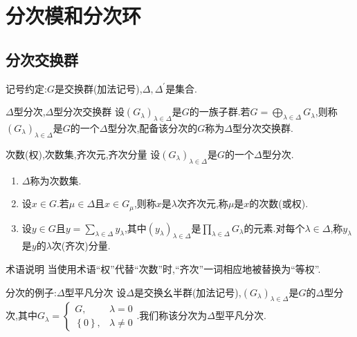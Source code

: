 \chapter{分次模和分次环}

\section{分次交换群}

记号约定:$G$是交换群(加法记号),$\Delta,\Delta^{\prime}$是集合.

\begin{definition}{$\Delta$型分次,$\Delta$型分次交换群}{}
	设$\left(G_{\lambda}\right)_{\lambda\in\Delta}$是$G$的一族子群.若$G=\bigoplus\limits_{\lambda\in\Delta}G_{\lambda}$,则称$\left(G_{\lambda}\right)_{\lambda\in\Delta}$是$G$的一个$\Delta$型分次,配备该分次的$G$称为$\Delta$型分次交换群.
\end{definition}

\begin{definition}{次数(权),次数集,齐次元,齐次分量}{}
	设$\left(G_{\lambda}\right)_{\lambda\in\Delta}$是$G$的一个$\Delta$型分次.
	\begin{enumerate}
		\item $\Delta$称为次数集.
		\item 设$x\in G$.若$\mu\in\Delta$且$x\in G_{\mu}$,则称$x$是$\lambda$次齐次元,称$\mu$是$x$的次数(或权).
		\item 设$y\in G$且$y=\sum\limits_{\lambda\in\Delta}y_{\lambda}$,其中$\left(y_{\lambda}\right)_{\lambda\in\Delta}$是$\prod\limits_{\lambda\in\Delta}G_{\lambda}$的元素.对每个$\lambda\in\Delta$,称$y_{\lambda}$是$y$的$\lambda$次(齐次)分量.
	\end{enumerate}
\end{definition}

\begin{remark}{术语说明}{}
	当使用术语``权''代替``次数''时,``齐次''一词相应地被替换为``等权''.
\end{remark}

\begin{example}{分次的例子:$\Delta$型平凡分次}{}
	设$\Delta$是交换幺半群(加法记号),$\left(G_{\lambda}\right)_{\lambda\in\Delta}$是$G$的$\Delta$型分次,其中$G_{\lambda}=
	\begin{cases}
		G,&\lambda=0\\
		\left\{0\right\},&\lambda\neq 0
	\end{cases}$.我们称该分次为$\Delta$型平凡分次.
\end{example}

